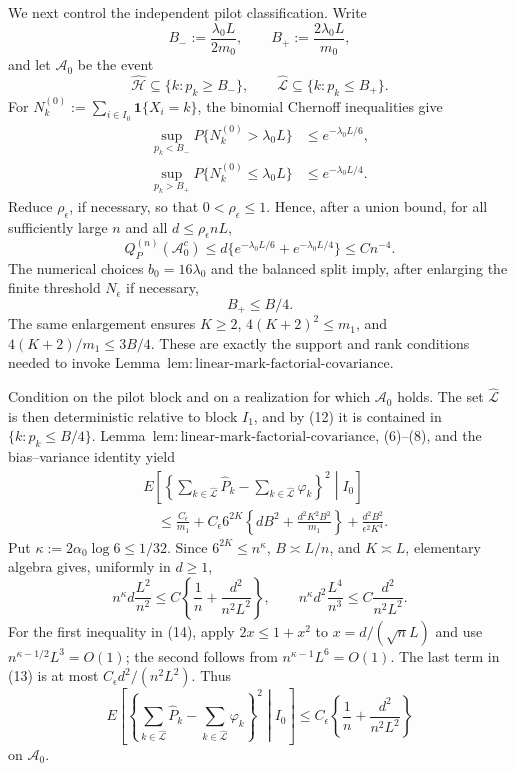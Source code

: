 We next control the independent pilot classification.  Write
\[
 B_-:=\frac{\lambda_0L}{2m_0},\qquad
 B_+:=\frac{2\lambda_0L}{m_0},
\]
and let \(\mathcal A_0\) be the event
\[
 \widehat{\mathcal H}\subseteq\{k:p_k\ge B_-\},
 \qquad
 \widehat{\mathcal L}\subseteq\{k:p_k\le B_+\}.                              \tag{9}
\]
For \(N_k^{(0)}:=\sum_{i\in I_0}\mathbf 1\{X_i=k\}\), the binomial Chernoff inequalities give
\[
 \begin{split}
 \sup_{p_k<B_-}P\{N_k^{(0)}>\lambda_0L\}&\le e^{-\lambda_0L/6},\\
 \sup_{p_k>B_+}P\{N_k^{(0)}\le\lambda_0L\}&\le e^{-\lambda_0L/4}.
 \end{split}                                                                    \tag{10}
\]
Reduce \(\rho_\epsilon\), if necessary, so that \(0<\rho_\epsilon\le1\).  Hence, after a union bound, for all sufficiently large \(n\) and all \(d\le\rho_\epsilon nL\),
\[
 Q_P^{(n)}(\mathcal A_0^c)
 \le d\{e^{-\lambda_0L/6}+e^{-\lambda_0L/4}\}
 \le Cn^{-4}.                                                                   \tag{11}
\]
The numerical choices \(b_0=16\lambda_0\) and the balanced split imply, after enlarging the finite threshold \(N_\epsilon\) if necessary,
\[
 B_+\le B/4.                                                                    \tag{12}
\]
The same enlargement ensures \(K\ge2\), \(4(K+2)^2\le m_1\), and \(4(K+2)/m_1\le3B/4\).  These are exactly the support and rank conditions needed to invoke Lemma~\(\mathrm{lem:linear\text{-}mark\text{-}factorial\text{-}covariance}\).

Condition on the pilot block and on a realization for which \(\mathcal A_0\) holds.  The set \(\widehat{\mathcal L}\) is then deterministic relative to block \(I_1\), and by (12) it is contained in \(\{k:p_k\le B/4\}\).  Lemma~\(\mathrm{lem:linear\text{-}mark\text{-}factorial\text{-}covariance}\), (6)--(8), and the bias--variance identity yield
\[
 \begin{aligned}
 &E\left[\left\{\sum_{k\in\widehat{\mathcal L}}\widehat P_k
       -\sum_{k\in\widehat{\mathcal L}}\varphi_k\right\}^2
       \middle| I_0\right]\\
 &\quad\le \frac{C_\epsilon}{m_1}
 +C_\epsilon6^{2K}\left\{dB^2+\frac{d^2K^2B^2}{m_1}\right\}
 +\frac{d^2B^2}{\epsilon^2K^4}.                                                 \tag{13}
\end{aligned}
\]
Put \(\kappa:=2\alpha_0\log6\le1/32\).  Since \(6^{2K}\le n^\kappa\), \(B\asymp L/n\), and \(K\asymp L\), elementary algebra gives, uniformly in \(d\ge1\),
\[
 n^\kappa d\frac{L^2}{n^2}
 \le C\left\{\frac1n+\frac{d^2}{n^2L^2}\right\},
 \qquad
 n^\kappa d^2\frac{L^4}{n^3}
 \le C\frac{d^2}{n^2L^2}.                                                       \tag{14}
\]
For the first inequality in (14), apply \(2x\le1+x^2\) to \(x=d/(\sqrt nL)\) and use \(n^{\kappa-1/2}L^3=O(1)\); the second follows from \(n^{\kappa-1}L^6=O(1)\).  The last term in (13) is at most \(C_\epsilon d^2/(n^2L^2)\).  Thus
\[
 E\left[\left\{\sum_{k\in\widehat{\mathcal L}}\widehat P_k
       -\sum_{k\in\widehat{\mathcal L}}\varphi_k\right\}^2
       \middle| I_0\right]
 \le C_\epsilon\left\{\frac1n+\frac{d^2}{n^2L^2}\right\}                  \tag{15}
\]
on \(\mathcal A_0\).

